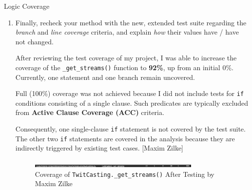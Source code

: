 \documentclass[a4paper]{scrreprt}
\newcounter{question}
\begin{document}
\begin{question}{Logic Coverage}
\begin{enumerate}[topsep=0pt, leftmargin=*]
\begin{answer}
\begin{longtable}{|l|l|}
\end{longtable}
          \end{answer}

    \item Finally, recheck your method with the new, extended test suite regarding the \textit{branch} and \textit{line coverage} criteria, and explain \textit{how} their values have / have not changed.
          \begin{answer}
After reviewing the test coverage of my project, I was able to increase the coverage of the \texttt{\_get\_streams()} function to \textbf{92\%}, up from an initial 0\%. Currently, one statement and one branch remain uncovered.

Full (100\%) coverage was not achieved because I did not include tests for \texttt{if} conditions consisting of a single clause. Such predicates are typically excluded from \textbf{Active Clause Coverage (ACC)} criteria.

Consequently, one single-clause \texttt{if} statement is not covered by the test suite. The other two \texttt{if} statements are covered in the analysis because they are indirectly triggered by existing test cases. [Maxim Zilke]

            \begin{figure}[h]
  \centering
  \includegraphics[width=0.8\textwidth]{coverage_after_test.png}
  \caption{Coverage of \texttt{TwitCasting.\_get\_streams()} After Testing by Maxim Zilke}
  \label{fig:meinbild}
\end{figure}



\end{answer}
\end{enumerate}
\end{question}
\end{document}
